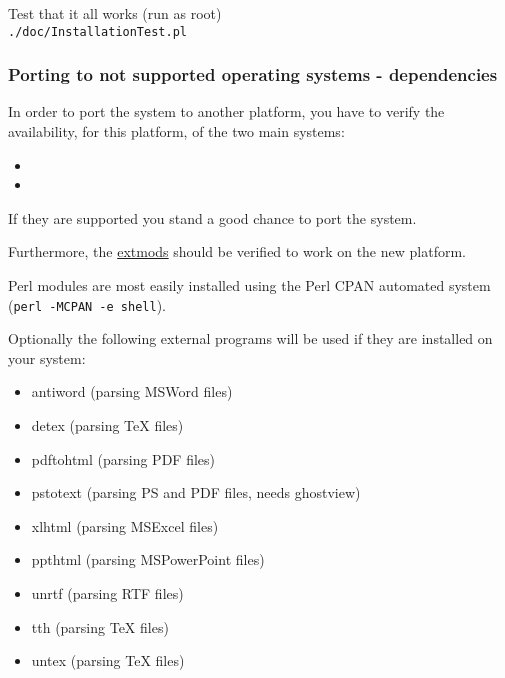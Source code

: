 Test that it all works (run as root)\\
{\tt ./doc/InstallationTest.pl}

\subsubsection{Porting to not supported operating systems - dependencies}
In order to port the system to another platform, you
have to verify the availability, for this platform, of the two main systems:
\begin{itemize}
\item {}
\item {}
\end{itemize}
If they are supported you stand a good chance to port the system.

Furthermore,
the \hyperref{external Perl modules}{external Perl modules (listed in }{)}{extmods} should be verified to work
on the new platform.


Perl modules are most easily installed 
using the Perl CPAN automated system\\
({\tt perl -MCPAN -e shell}).

\hspace{-\parindent}Optionally the following external programs will be used if they are
installed on your system:
\begin{itemize}
 \item antiword (parsing MSWord files)
 \item detex (parsing TeX files)
 \item pdftohtml (parsing PDF files)
 \item pstotext (parsing PS and PDF files, needs ghostview)
 \item xlhtml (parsing MSExcel files)
 \item ppthtml (parsing MSPowerPoint files)
 \item unrtf (parsing RTF files)
 \item tth (parsing TeX files)
 \item untex (parsing TeX files)
\end{itemize}

